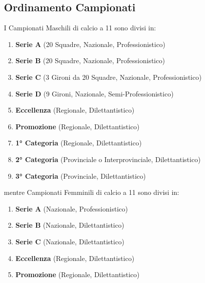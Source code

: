 \documentclass[../uefaC.tex]{subfiles}
\begin{document}
\subsection{Ordinamento Campionati}
I Campionati Maschili di calcio a 11 sono divisi in:
\begin{enumerate}
    \item\textbf{Serie A} (20 Squadre, Nazionale, Professionistico)
    \item\textbf{Serie B} (20 Squadre, Nazionale, Professionistico)
    \item\textbf{Serie C} (3 Gironi da 20 Squadre, Nazionale, Professionistico)
    \item\textbf{Serie D} (9 Gironi, Nazionale, Semi-Professionistico)
    \item\textbf{Eccellenza} (Regionale, Dilettantistico)
    \item\textbf{Promozione} (Regionale, Dilettantistico)
    \item\textbf{1° Categoria} (Regionale, Dilettantistico)
    \item\textbf{2° Categoria} (Provinciale o Interprovinciale, Dilettantistico)
    \item\textbf{3° Categoria} (Provinciale, Dilettantistico)
\end{enumerate}
mentre Campionati Femminili di calcio a 11 sono divisi in:
\begin{enumerate}
    \item\textbf{Serie A} (Nazionale, Professionistico)
    \item\textbf{Serie B} (Nazionale, Dilettantistico)
    \item\textbf{Serie C} (Nazionale, Dilettantistico)
    \item\textbf{Eccellenza} (Regionale, Dilettantistico)
    \item\textbf{Promozione} (Regionale, Dilettantistico)
\end{enumerate}
\end{document}
